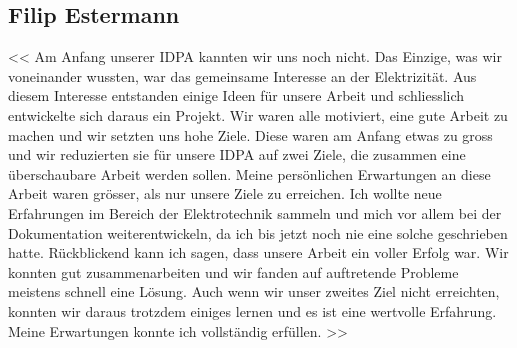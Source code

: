 \subsection{Filip Estermann}
<< Am Anfang unserer IDPA kannten wir uns noch nicht. Das Einzige, was wir voneinander wussten, war das gemeinsame Interesse an der Elektrizität. Aus diesem Interesse entstanden einige Ideen für unsere Arbeit und schliesslich entwickelte sich daraus ein Projekt. Wir waren alle motiviert, eine gute Arbeit zu machen und wir setzten uns hohe Ziele. Diese waren am Anfang etwas zu gross und wir reduzierten sie für unsere IDPA auf zwei Ziele, die zusammen eine überschaubare Arbeit werden sollen.
\newpara
Meine persönlichen Erwartungen an diese Arbeit waren grösser, als nur unsere Ziele zu erreichen. Ich wollte neue Erfahrungen im Bereich der Elektrotechnik sammeln und mich vor allem bei der Dokumentation weiterentwickeln, da ich bis jetzt noch nie eine solche geschrieben hatte. 
\newpara
Rückblickend kann ich sagen, dass unsere Arbeit ein voller Erfolg war. Wir konnten gut zusammenarbeiten und wir fanden auf auftretende Probleme meistens schnell eine Lösung. Auch wenn wir unser zweites Ziel nicht erreichten, konnten wir daraus trotzdem einiges lernen und es ist eine wertvolle Erfahrung. Meine Erwartungen konnte ich vollständig erfüllen. >>